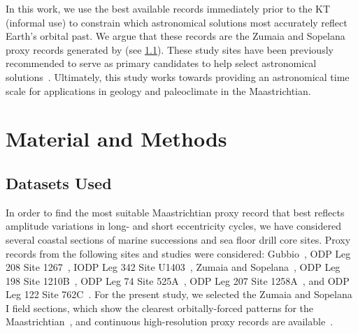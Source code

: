 \documentclass[draft]{agujournal2019}
\newcommand{\ma}[1]{Ma\(_{405}\)#1} %
\newcommand{\ijk}{\textcolor{blue}}
\begin{document}
In this work, we use the best available records immediately prior to the \gls{KT} (informal use) to constrain which astronomical solutions most accurately reflect Earth's orbital past.
We argue that these records are the Zumaia and Sopelana proxy records generated by  (see \cref{sec:data}).
These study sites have been previously recommended to serve as primary candidates to help select astronomical solutions~\cite{Dinares-Turell2013}.
Ultimately, this study works towards providing an astronomical time scale for applications in geology and paleoclimate in the Maastrichtian.


\section{Material and Methods}\label{sec:mm}


\subsection{Datasets Used}\label{sec:data}

In order to find the most suitable Maastrichtian proxy record that best reflects amplitude variations in long- and short eccentricity cycles,
we have considered several coastal sections of marine successions and sea floor drill core sites.
Proxy records from the following sites and studies were considered:
Gubbio~\cite{Voigt2012,Sinnesael2016}, %
ODP Leg 208 Site 1267~\cite{Westerhold2008,Husson2011}, %
IODP Leg 342 Site U1403~\cite{Batenburg2018}, %
Zumaia and Sopelana~\cite{tenKateSprenger1993,Batenburg2012,Batenburg2014,Dinares-Turell2013}, %
ODP Leg 198 Site 1210B~\cite{Jung2012,Kim2022}, %
ODP Leg 74 Site 525A~\cite{Husson2011}, %
ODP Leg 207 Site 1258A~\cite{Husson2011}, %
and ODP Leg 122 Site 762C~\cite{Husson2011,Thibault2012}. %
For the present study, we selected the Zumaia and Sopelana I field sections,
which show the clearest orbitally-forced patterns for the Maastrichtian~\cite{tenKateSprenger1993,Batenburg2012,Dinares-Turell2013},
and continuous high-resolution proxy records are available~\cite{Batenburg2012,Batenburg2014}.
\end{document}
